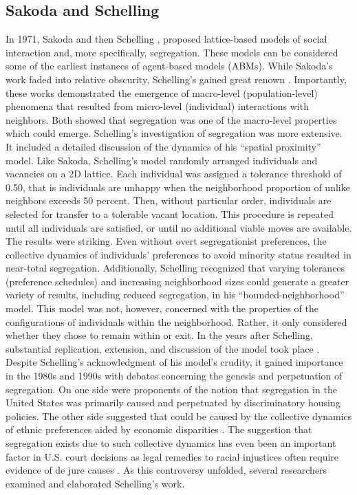 \documentclass[a4paper]{article}
\begin{document}
\subsection{Sakoda and Schelling}
In 1971, Sakoda \cite{SakodaJamesM.1971Tcmo} and then Schelling \cite{schelling1971dynamic}, proposed lattice-based models of social interaction and, more specifically, segregation. These models can be considered some of the earliest instances of agent-based models (ABMs). While Sakoda’s work faded into relative obscurity, Schelling’s gained great renown \cite{HegselmannRainer2017TCSa}. Importantly, these works demonstrated the emergence of macro-level (population-level) phenomena that resulted from micro-level (individual) interactions with neighbors. Both showed that segregation was one of the macro-level properties which could emerge.
Schelling’s investigation of segregation was more extensive. It included a detailed discussion of the dynamics of his “spatial proximity” model. Like Sakoda, Schelling’s model randomly arranged individuals and vacancies on a 2D lattice. Each individual was assigned a tolerance threshold of 0.50, that is individuals are unhappy when the neighborhood proportion of unlike neighbors exceeds 50 percent. Then, without particular order, individuals are selected for transfer to a tolerable vacant location. This procedure is repeated until all individuals are satisfied, or until no additional viable moves are available. The results were striking. Even without overt segregationist preferences, the collective dynamics of individuals’ preferences to avoid minority status resulted in near-total segregation.
Additionally, Schelling recognized that varying tolerances (preference schedules) and increasing neighborhood sizes could generate a greater variety of results, including reduced segregation, in his “bounded-neighborhood” model. This model was not, however, concerned with the properties of the configurations of individuals within the neighborhood. Rather, it only considered whether they chose to remain within or exit.
In the years after Schelling, substantial replication, extension, and discussion of the model took place \cite{clark2008understanding}. Despite Schelling’s acknowledgment of his model’s crudity, it gained importance in the 1980s and 1990s with debates concerning the genesis and perpetuation of segregation. On one side were proponents of the notion that segregation in the United States was primarily caused and perpetuated by discriminatory housing policies. The other side suggested that could be caused by the collective dynamics of ethnic preferences aided by economic disparities \cite{clark2008understanding}. The suggestion that segregation exists due to such collective dynamics has even been an important factor in U.S. court decisions as legal remedies to racial injustices often require evidence of de jure causes \cite{FrankenbergErica2018DFST}. As this controversy unfolded, several researchers examined and elaborated Schelling’s work.
\end{document}
